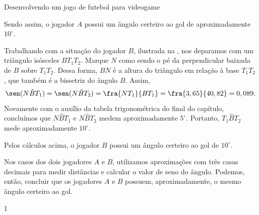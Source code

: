 \begin{answer}{Desenvolvendo um jogo de futebol para videogame}
{\begin{enumerate}
    Sendo assim, o jogador $A$ possui um ângulo certeiro ao gol de aproximadamente $10^\circ$.
    
    
    Trabalhando com a situação do jogador $B$, ilustrada na , nos deparamos com um triângulo isósceles $BT_1T_2$. Marque $N$ como sendo o pé da perpendicular baixada de $B$ sobre $T_1T_2$. Dessa forma, $BN$ é a altura do triângulo em relação à base $T_1T_2$, que também é a bissetriz do ângulo $B$. Assim,
    $$\sen(N\hat{B}T_1)=\sen(N\hat{B}T_2)=\fra{NT_1}{BT_1}=\fra{3,65}{40,82}=0,089.$$
    Novamente com o auxílio da tabela trigonométrica do final do capítulo, concluímos que $N\hat{B}T_1$ e $N\hat{B}T_2$ medem aproximadamente $5^\circ$. Portanto, $T_1\hat{B}T_2$ mede aproximadamente $10^\circ$.
    
    Pelos cálculos acima, o jogador $B$ possui um ângulo certeiro ao gol de $10^\circ$.
    
    Nos casos dos dois jogadores $A$ e $B$, utilizamos aproximações com três casas decimais para medir distâncias e calcular o valor de seno do ângulo. Podemos, então, concluir que os jogadores $A$ e $B$ possuem, aproximadamente, o mesmo ângulo certeiro ao gol. 
\end{enumerate}
}{1}
\end{answer}


